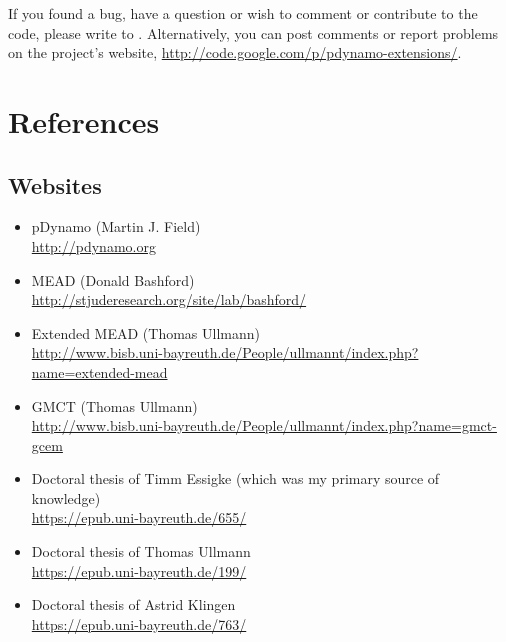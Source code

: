 \documentclass[a4paper,11pt]{article}
\begin{document}
If you found a bug, have a question or wish to comment or contribute to the code, 
please write to 
.
%
Alternatively, you can post comments or report problems on the project's website,
\url{http://code.google.com/p/pdynamo-extensions/}.


\section{References}
\renewcommand{\refname}{}
\vspace*{-1cm}

\linespread{0.8}



\linespread{1.6}


\subsection*{Websites}

\begin{itemize}
  \item pDynamo (Martin J. Field)\\ \url{http://pdynamo.org}

  \item MEAD (Donald Bashford)\\ \url{http://stjuderesearch.org/site/lab/bashford/}

  \item Extended MEAD (Thomas Ullmann)\\ \url{http://www.bisb.uni-bayreuth.de/People/ullmannt/index.php?name=extended-mead}

  \item GMCT (Thomas Ullmann)\\ \url{http://www.bisb.uni-bayreuth.de/People/ullmannt/index.php?name=gmct-gcem}

  \item Doctoral thesis of Timm Essigke (which was my primary source of knowledge)\\ \url{https://epub.uni-bayreuth.de/655/}

  \item Doctoral thesis of Thomas Ullmann\\ \url{https://epub.uni-bayreuth.de/199/}

  \item Doctoral thesis of Astrid Klingen\\ \url{https://epub.uni-bayreuth.de/763/}
\end{itemize}
\end{document}
